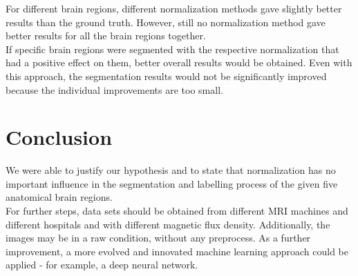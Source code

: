 \documentclass[article]{IEEEtran}
\begin{document}
\begin{multicols}{2}
	For different brain regions, different normalization methods gave slightly better results than the ground truth. 
	However, still no normalization method gave better results for all the brain regions together.\\	
	
	If specific brain regions were segmented with the respective normalization that had a positive effect on them, better overall results would be obtained. 
	Even with this approach, the segmentation results would not be significantly improved because the individual improvements are too small.



\section{Conclusion}
	We were able to justify our hypothesis and to state that normalization has no important influence in the segmentation and labelling process of the given five anatomical brain regions. \\
	For further steps, data sets should be obtained from different MRI machines and different hospitals and with different magnetic flux density.
	Additionally, the images may be in a raw condition, without any preprocess.
	As a further improvement, a more evolved and innovated machine learning approach could be applied - for example, a deep neural network.
	


 

\end{multicols}
\end{document}
